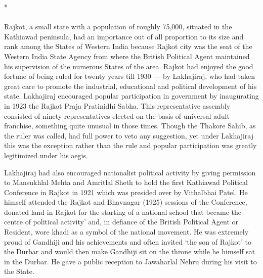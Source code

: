 \begin{center}*\end{center}

\paragraph*{}


Rajkot, a small state with a population of roughly 75,000, situated in the Kathiawad peninsula, had an importance out of all proportion to its size and rank among the States of Western India because Rajkot city was the seat of the Western India State Agency from where the British Political Agent maintained his supervision of the numerous States of the area. Rajkot had enjoyed the good fortune of being ruled for twenty years till 1930 — by Lakhajiraj, who had taken great care to promote the industrial, educational and political development of his state. Lakhajiraj encouraged popular participation in government by inaugurating in 1923 the Rajkot Praja Pratinidhi Sabha. This representative assembly consisted of ninety representatives elected on the basis of universal adult franchise, something quite unusual in those times. Though the Thakore Sahib, as the ruler was called, had full power to veto any suggestion, yet under Lakhajiraj this was the exception rather than the rule and popular participation was greatly legitimized under his aegis. 

Lakhajiraj had also encouraged nationalist political activity by giving permission to Mansukhlal Mehta and Amritlal Sheth to hold the first Kathiawad Political Conference in Rajkot in 1921 which was presided over by Vithalbhai Patel. He himself attended the Rajkot and Bhavnagar (1925) sessions of the Conference, donated land in Rajkot for the starting of a national school that became the centre of political activity' and, in defiance of the British Political Agent or Resident, wore khadi as a symbol of the national movement. He was extremely proud of Gandhiji and his achievements and often invited `the son of Rajkot' to the Durbar and would then make Gandhiji sit on the throne while he himself sat in the Durbar. He gave a public reception to Jawaharlal Nehru during his visit to the State. 

